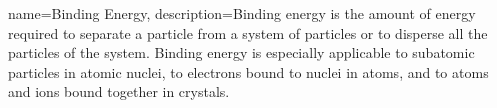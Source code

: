 
{
name=Binding Energy,
    description={Binding energy is the amount of energy required to separate a particle from a system of particles or to disperse all the particles of the system. Binding energy is especially applicable to subatomic particles in atomic nuclei, to electrons bound to nuclei in atoms, and to atoms and ions bound together in crystals.}
}

